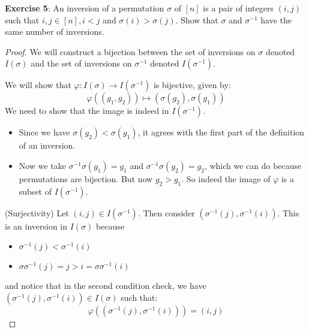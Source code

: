 \documentclass{article}
\begin{document}
\textbf{Exercise 5}: An inversion of a permutation $\sigma$ of $[n]$ is a pair of integers $(i, j)$ such that $i, j \in [n], i < j$ and $\sigma(i) > \sigma(j)$. Show that $\sigma$ and $\sigma^{-1}$ have the same number of inversions.
    \begin{proof}
        We will construct a bijection between the set of inversions on $\sigma$ denoted $I(\sigma)$ and the set of inversions on $\sigma^{-1}$ denoted $I(\sigma^{-1})$. 

        We will show that $\varphi: I(\sigma) \rightarrow I(\sigma^{-1})$ is bijective, given by:
            \begin{equation*}
                \varphi((g_{1}, g_{2})) \mapsto (\sigma(g_{2}), \sigma(g_{1}))
            \end{equation*}
        We need to show that the image is indeed in $I(\sigma^{-1})$. 
            \begin{itemize}
                \item Since we have $\sigma(g_{2}) < \sigma(g_{1})$, it agrees with the first part of the definition of an inversion.

                \item  Now we take $\sigma^{-1}\sigma(g_{1}) = g_{1}$ and $\sigma^{-1}\sigma(g_{2}) = g_{2}$, which we can do because permutations are bijection. But now $g_{2} > g_{1}$. So indeed the image of $\varphi$ is a subset of $I(\sigma^{-1})$.
            \end{itemize}

        (Surjectivity) Let $(i, j) \in I(\sigma^{-1})$. Then consider $(\sigma^{-1}(j), \sigma^{-1}(i))$. This is an inversion in $I(\sigma)$ because 
            \begin{itemize}
                \item $\sigma^{-1}(j) < \sigma^{-1}(i)$

                \item $\sigma\sigma^{-1}(j) = j > i = \sigma\sigma^{-1}(i)$ 
            \end{itemize}
        and notice that in the second condition check, we have $(\sigma^{-1}(j), \sigma^{-1}(i)) \in I(\sigma)$ such that:
            \begin{equation*}
                \varphi((\sigma^{-1}(j), \sigma^{-1}(i))) = (i, j)
            \end{equation*}
        

\end{proof}
\end{document}
